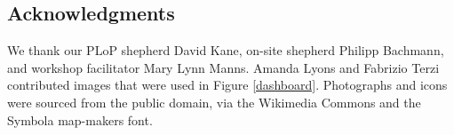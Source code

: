 \subsection*{Acknowledgments}
We thank our PLoP shepherd David Kane, on-site shepherd Philipp
Bachmann, and workshop facilitator Mary Lynn Manns.  Amanda Lyons and
Fabrizio Terzi contributed images that were used in Figure
\ref{dashboard}.  Photographs and icons were sourced from the public
domain, via the Wikimedia Commons and the Symbola map-makers font.











